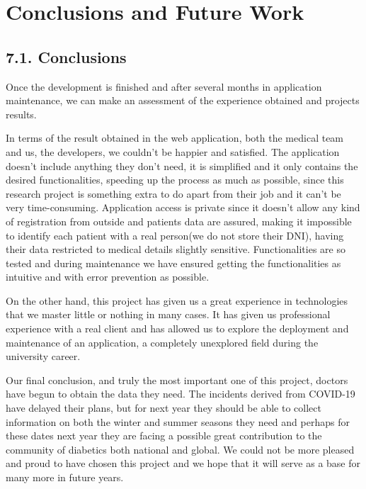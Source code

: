 \chapter*{Conclusions and Future Work}

\section*{7.1. Conclusions}


    Once the development is finished and after several months in application maintenance, we can make an assessment of the experience obtained  and projects results. \newline

    In terms of the result obtained in the web application, both the medical team and us, the developers, we couldn't be happier and satisfied. The application doesn't include anything they don't need, it is simplified and it only contains the desired functionalities, speeding up the process as much as possible, since this research project is something extra to do apart from their job and it can't be very time-consuming. Application access is private since it doesn't allow any kind of registration from outside and patients data are assured, making it impossible to identify each patient with a real person(we do not store their DNI), having their data restricted  to medical details slightly sensitive. Functionalities are so tested and during maintenance we have ensured getting the functionalities as intuitive and with error prevention as possible. \newline
    
    On the other hand, this project has given us a great experience in technologies that we master little or nothing in many cases. It has given us professional experience with a real client and has allowed us to explore the deployment and maintenance of an application, a completely unexplored field during the university career. \newline
   
    Our final conclusion, and truly the most important one of this project, doctors have begun to obtain the data they need.
    The incidents derived from COVID-19 have delayed their plans, but for next year they should be able to collect information
    on both the winter and summer seasons they need and perhaps for these dates next year they are facing a possible great contribution to the community of diabetics both national and global. We could not be more pleased and proud to have chosen this project and we hope that it will serve as a base for many more in future years. \newline
    
